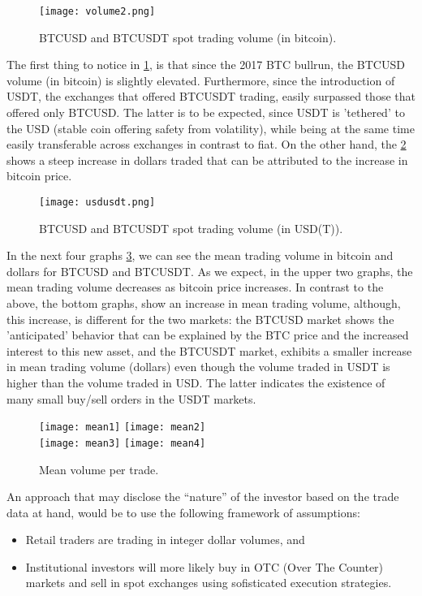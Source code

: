 \begin{figure}[h]
    \centering
    \texttt{[image: volume2.png]}
    \caption{BTCUSD and BTCUSDT spot trading volume (in bitcoin).}
    \label{fig:vol2}
\end{figure}

The first thing to notice in \ref{fig:vol2}, is that since the 2017 BTC bullrun, the BTCUSD volume (in bitcoin) is slightly elevated. Furthermore, since the introduction of USDT, the exchanges that offered BTCUSDT trading, easily surpassed those that offered only BTCUSD. The latter is to be expected, since USDT is 'tethered' to the USD (stable coin offering safety from volatility), while being at the same time easily transferable across exchanges in contrast to fiat. On the other hand, the \ref{fig:vol3} shows a steep increase in dollars traded that can be attributed to the increase in bitcoin price. 

\begin{figure}[h]
    \centering
    \texttt{[image: usdusdt.png]}
    \caption{BTCUSD and BTCUSDT spot trading volume (in USD(T)).}
    \label{fig:vol3}
\end{figure}

In the next four graphs \ref{fig:mean}, we can see the mean trading volume in bitcoin and dollars for BTCUSD and BTCUSDT. As we expect, in the upper two graphs, the mean trading volume decreases as bitcoin price increases. In contrast to the above, the bottom graphs, show an increase in mean trading volume, although, this increase, is different for the two markets: the BTCUSD market shows the 'anticipated' behavior that can be explained by the BTC price and the increased interest to this new asset, and the BTCUSDT market, exhibits a smaller increase in mean trading volume (dollars) even though the volume traded in USDT is higher than the volume traded in USD. The latter indicates the existence of many small buy/sell orders in the USDT markets.

\begin{figure}[H]
	\centering
    \texttt{[image: mean1]}
    \texttt{[image: mean2]}
    \\[\smallskipamount]
    \texttt{[image: mean3]}
    \texttt{[image: mean4]}
    \caption{Mean volume per trade.}
    \label{fig:mean}
\end{figure}


An approach that may disclose the “nature” of the investor based on the trade data at hand, would be to use the following framework of assumptions: 
\begin{itemize}
\item Retail traders are trading in integer dollar volumes, and
\item Institutional investors will more likely buy in OTC (Over The Counter) markets and sell in spot exchanges using sofisticated execution strategies.
\end{itemize} 


